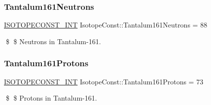 \subsubsection{\texorpdfstring{Tantalum161\+Neutrons}{Tantalum161Neutrons}}
{\footnotesize\ttfamily \mbox{\hyperlink{group___isotope_const-_macros_ga5f18360b3e99483a35c32d789e62621c}{I\+S\+O\+T\+O\+P\+E\+C\+O\+N\+S\+T\+\_\+\+I\+NT}} Isotope\+Const\+::\+Tantalum161\+Neutrons = 88}

\$ \$ Neutrons in Tantalum-\/161. \mbox{\label{group___isotope_const-_tantalum-_ta161_ga19eb6eb9a244d7244683966cb31c083a}} 
\subsubsection{\texorpdfstring{Tantalum161\+Protons}{Tantalum161Protons}}
{\footnotesize\ttfamily \mbox{\hyperlink{group___isotope_const-_macros_ga5f18360b3e99483a35c32d789e62621c}{I\+S\+O\+T\+O\+P\+E\+C\+O\+N\+S\+T\+\_\+\+I\+NT}} Isotope\+Const\+::\+Tantalum161\+Protons = 73}

\$ \$ Protons in Tantalum-\/161. 